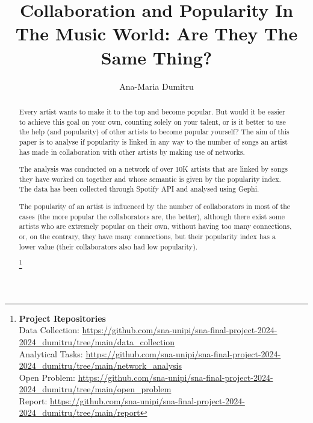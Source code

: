 \documentclass[sigchi]{acmart}
\begin{document}
%
\title{Collaboration and Popularity In The Music World: Are They The Same Thing?}

%
\author{Ana-Maria Dumitru}


\renewcommand{\shortauthors}{Ana-Maria Dumitru}


\begin{abstract}
Every artist wants to make it to the top and become popular. But would it be easier to achieve this goal on your own, counting solely on your talent, or is it better to use the help (and popularity) of other artists to become popular yourself? The aim of this paper is to analyse if popularity is linked in any way to the number of songs an artist has made in collaboration with other artists by making use of networks.

The analysis was conducted on a network of over 10K artists that are linked by songs they have worked on together and whose semantic is given by the popularity index. The data has been collected through Spotify API and analysed using Gephi. 

The popularity of an artist is influenced by the number of collaborators in most of the cases (the more popular the collaborators are, the better), although there exist some artists who are extremely popular on their own, without having too many connections, or, on the contrary, they have many connections, but their popularity index has a lower value (their collaborators also had low popularity).

\footnote{
{\bf Project Repositories}\\
\noindent Data Collection: \url{https://github.com/sna-unipi/sna-final-project-2024-2024_dumitru/tree/main/data_collection}\\
\noindent Analytical Tasks: \url{https://github.com/sna-unipi/sna-final-project-2024-2024_dumitru/tree/main/network_analysis}\\
\noindent Open Problem: \url{https://github.com/sna-unipi/sna-final-project-2024-2024_dumitru/tree/main/open_problem}\\
\noindent Report: \url{https://github.com/sna-unipi/sna-final-project-2024-2024_dumitru/tree/main/report}}
\end{abstract}
\end{document}
